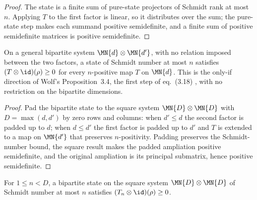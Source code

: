 \begin{proof}
    \leanok
    The state is a finite sum of pure-state projectors of Schmidt rank at most $n$.
    Applying $T$ to the first factor is linear, so it distributes over the sum; the
    pure-state step makes each summand positive semidefinite, and a finite sum of
    positive semidefinite matrices is positive semidefinite.
\end{proof}

\begin{theorem}
    \label{thm:has_schmidt_number_le_tensor_map_id_general}
    \leanok
    On a general bipartite system $\MN{d}\otimes\MN{d'}$, with no relation imposed
    between the two factors, a state of Schmidt number at most $n$ satisfies
    $(T\otimes\id)(\rho)\ge 0$ for every $n$-positive map $T$ on $\MN{d}$.
    This is the only-if direction of Wolf's Proposition~3.4, the first step of
    eq.~(3.18) \cite[Chapter~3, Proposition~3.4]{Wolf2012Quantum}, with no restriction
    on the bipartite dimensions.
\end{theorem}

\begin{proof}
    \leanok
    Pad the bipartite state to the square system $\MN{D}\otimes\MN{D}$ with
    $D=\max(d,d')$ by zero rows and columns: when $d'\le d$ the second factor is padded
    up to $d$; when $d\le d'$ the first factor is padded up to $d'$ and $T$ is extended
    to a map on $\MN{d'}$ that preserves $n$-positivity. Padding preserves the
    Schmidt-number bound, the square result makes the padded ampliation positive
    semidefinite, and the original ampliation is its principal submatrix, hence positive
    semidefinite.
\end{proof}

\begin{theorem}
    \label{thm:has_schmidt_number_le_tensor_map_id_t_eta}
    \leanok
    For $1\le n<D$, a bipartite state on the square system
    $\MN{D}\otimes\MN{D}$ of Schmidt number at most $n$ satisfies
    $(T_n\otimes\id)(\rho)\ge 0$.
\end{theorem}

